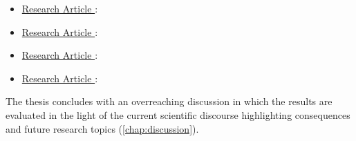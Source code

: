 \begin{itemize}
\item \hyperref[paperI]{Research Article }:\\ 
\item \hyperref[paperII]{Research Article }:\\ 
\item \hyperref[paperIII]{Research Article }:\\ 
\item \hyperref[paperIV]{Research Article }:\\ 
\end{itemize}
\noindent The thesis concludes with an overreaching discussion in which the results are evaluated in the light of the current scientific discourse highlighting consequences and future research topics (\autoref{chap:discussion}). 
































